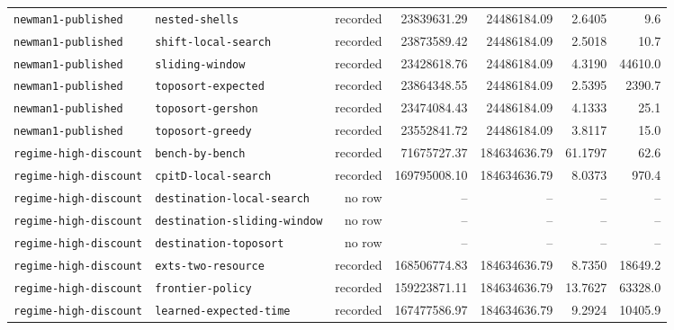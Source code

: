 \begin{longtable}{>{\raggedright\arraybackslash}p{}>{\raggedright\arraybackslash}p{}r r r r r}
\texttt{newman1\allowbreak-published} & \texttt{nested\allowbreak-shells} & recorded & 23839631.29 & 24486184.09 & 2.6405 & 9.6 \\
\texttt{newman1\allowbreak-published} & \texttt{shift\allowbreak-local\allowbreak-search} & recorded & 23873589.42 & 24486184.09 & 2.5018 & 10.7 \\
\texttt{newman1\allowbreak-published} & \texttt{sliding\allowbreak-window} & recorded & 23428618.76 & 24486184.09 & 4.3190 & 44610.0 \\
\texttt{newman1\allowbreak-published} & \texttt{toposort\allowbreak-expected} & recorded & 23864348.55 & 24486184.09 & 2.5395 & 2390.7 \\
\texttt{newman1\allowbreak-published} & \texttt{toposort\allowbreak-gershon} & recorded & 23474084.43 & 24486184.09 & 4.1333 & 25.1 \\
\texttt{newman1\allowbreak-published} & \texttt{toposort\allowbreak-greedy} & recorded & 23552841.72 & 24486184.09 & 3.8117 & 15.0 \\
\texttt{regime\allowbreak-high\allowbreak-discount} & \texttt{bench\allowbreak-by\allowbreak-bench} & recorded & 71675727.37 & 184634636.79 & 61.1797 & 62.6 \\
\texttt{regime\allowbreak-high\allowbreak-discount} & \texttt{cpitD\allowbreak-local\allowbreak-search} & recorded & 169795008.10 & 184634636.79 & 8.0373 & 970.4 \\
\texttt{regime\allowbreak-high\allowbreak-discount} & \texttt{destination\allowbreak-local\allowbreak-search} & no row & -- & -- & -- & -- \\
\texttt{regime\allowbreak-high\allowbreak-discount} & \texttt{destination\allowbreak-sliding\allowbreak-window} & no row & -- & -- & -- & -- \\
\texttt{regime\allowbreak-high\allowbreak-discount} & \texttt{destination\allowbreak-toposort} & no row & -- & -- & -- & -- \\
\texttt{regime\allowbreak-high\allowbreak-discount} & \texttt{exts\allowbreak-two\allowbreak-resource} & recorded & 168506774.83 & 184634636.79 & 8.7350 & 18649.2 \\
\texttt{regime\allowbreak-high\allowbreak-discount} & \texttt{frontier\allowbreak-policy} & recorded & 159223871.11 & 184634636.79 & 13.7627 & 63328.0 \\
\texttt{regime\allowbreak-high\allowbreak-discount} & \texttt{learned\allowbreak-expected\allowbreak-time} & recorded & 167477586.97 & 184634636.79 & 9.2924 & 10405.9 \\

\end{longtable}
